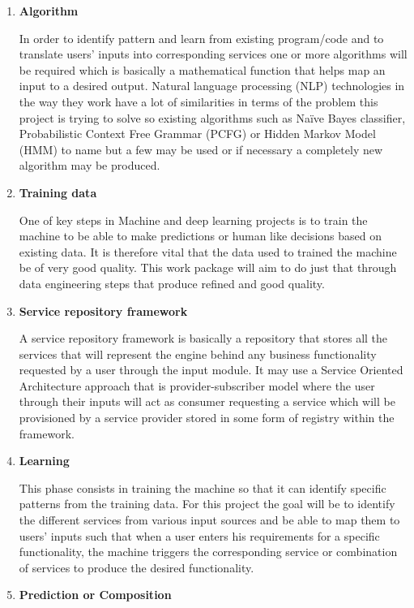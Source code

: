 \documentclass{article}
\begin{document}
\begin{enumerate}
\item \textbf{Algorithm}


In order to identify pattern and learn from existing program/code and to translate users’ inputs into corresponding services one or more algorithms will be required which is basically a mathematical function that helps map an input to a desired output. Natural language processing (NLP) technologies in the way they work have a lot of similarities in terms of the problem this project is trying to solve so existing algorithms such as Naïve Bayes classifier, Probabilistic Context Free Grammar (PCFG) or Hidden Markov Model (HMM) to name but a few may be used or if necessary a completely new algorithm may be produced.


\item \textbf{Training data}


One of key steps in Machine and deep learning projects is to train the machine to be able to make predictions or human like decisions based on existing data. It is therefore vital that the data used to trained the machine be of very good quality. This work package will aim to do just that through data engineering steps that produce refined and good quality.


\item \textbf{Service repository framework}


A service repository framework is basically a repository that stores all the services that will represent the engine behind any business functionality requested by a user through the input module. It may use a Service Oriented Architecture approach that is provider-subscriber model where the user through their inputs will act as consumer requesting a service which will be provisioned by a service provider stored in some form of registry within the framework.


\item \textbf{Learning}


This phase consists in training the machine so that it can identify specific patterns from the training data. For this project the goal will be to identify the different services from various input sources and be able to map them to users’ inputs such that when a user enters his requirements for a specific functionality, the machine triggers the corresponding service or combination of services to produce the desired functionality.


\item \textbf{Prediction or Composition}



\end{enumerate}
\end{document}
